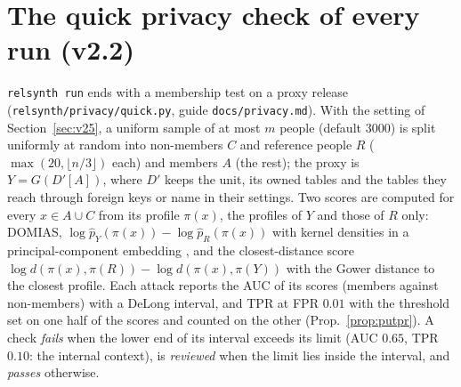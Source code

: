 \section{The quick privacy check of every run (v2.2)}\label{sec:quickcheck}
\setcounter{savedpropqc}{\value{proposition}}
\setcounter{proposition}{1739}
\texttt{relsynth run} ends with a membership test on a proxy release (\texttt{relsynth/privacy/quick.py}, guide
\texttt{docs/privacy.md}). With the setting of Section~\ref{sec:v25}, a uniform sample of at most $m$ people
(default 3000) is split uniformly at random into non-members $C$ and reference people $R$ ($\max(20,\lfloor n/3\rfloor)$
each) and members $A$ (the rest); the proxy is $Y=G(D'[A])$, where $D'$ keeps the unit, its owned tables and the
tables they reach through foreign keys or name in their settings. Two scores are computed for every $x\in A\cup C$
from its profile $\pi(x)$, the profiles of $Y$ and those of $R$ only: DOMIAS, $\log\hat p_Y(\pi(x))-\log\hat p_R(\pi(x))$
with kernel densities in a principal-component embedding \cite{vanbreugel2023}, and the closest-distance score
$\log d(\pi(x),\pi(R))-\log d(\pi(x),\pi(Y))$ with the Gower distance to the closest profile. Each attack reports the AUC of
its scores (members against non-members) with a DeLong interval, and TPR at FPR $0.01$ with the threshold set on one
half of the scores and counted on the other (Prop.~\ref{prop:putpr}). A check \emph{fails} when the lower end of its
interval exceeds its limit (AUC $0.65$, TPR $0.10$: the internal context), is \emph{reviewed} when the limit lies inside
the interval, and \emph{passes} otherwise.

